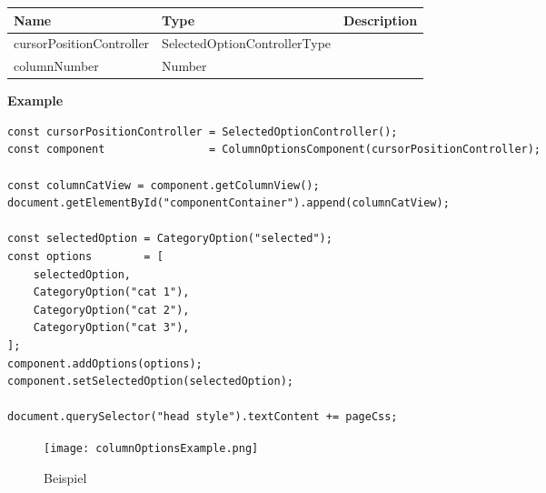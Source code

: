 \begin{table}[!htb] 
    \label{api:columnOptionsComponentParameter}
    \footnotesize
    \setlength\extrarowheight{4pt}
    \begin{tabular}{ p{3.2cm} p{4.2cm} p{5.6cm} }
        \toprule[1.2pt]
        \textbf{Name}            & \textbf{Type}                & \textbf{Description} \\
        \midrule
        cursorPositionController & SelectedOptionControllerType &  \\
        columnNumber             & Number                       &  \\
        \bottomrule[1.2pt]
    \end{tabular}
\end{table}

\vspace*{6pt}
\noindent
\textbf{Example}


\begin{lstlisting}[style = htmlcssjs, label = api:columnOptionsComponentExample]
const cursorPositionController = SelectedOptionController();
const component                = ColumnOptionsComponent(cursorPositionController);

const columnCatView = component.getColumnView();
document.getElementById("componentContainer").append(columnCatView);

const selectedOption = CategoryOption("selected");
const options        = [
    selectedOption,
    CategoryOption("cat 1"),
    CategoryOption("cat 2"),
    CategoryOption("cat 3"),
];
component.addOptions(options);
component.setSelectedOption(selectedOption);

document.querySelector("head style").textContent += pageCss;
\end{lstlisting}

\begin{figure}[!htb]
    \centering
    \texttt{[image: columnOptionsExample.png]}
    \caption*{\centering Beispiel }
    \label{api:columnOptionsComponentImg}
\end{figure}
